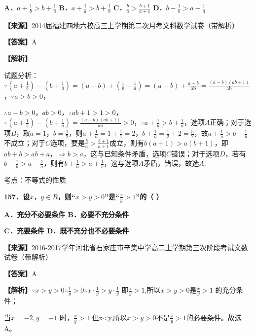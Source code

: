 \documentclass[
]{article}
\begin{document}
\textbf{A．}\(a + \frac{1}{b} > b + \frac{1}{a}\)
\textbf{B．}\(a + \frac{1}{a} > b + \frac{1}{b}\)
\textbf{C．}\(\frac{b}{a} > \frac{b + 1}{a + 1}\)
\textbf{D．}\(b - \frac{1}{b} > a - \frac{1}{a}\)

\textbf{【来源】}2014届福建四地六校高三上学期第二次月考文科数学试卷（带解析）

\textbf{【答案】}A

\textbf{【解析】}

试题分析：\(\because(a + \frac{1}{b}) - (b + \frac{1}{a}) = (a - b) + (\frac{1}{b} - \frac{1}{a}) = (a - b) + \frac{a - b}{\text{ab}} = \frac{(a - b)(ab + 1)}{\text{ab}}\)，\(\because a > b > 0\)，

\(\therefore a - b > 0\)，\(ab > 0\)，\(\therefore ab + 1 > 1 > 0\)，\(\therefore(a + \frac{1}{b}) - (b + \frac{1}{a}) = \frac{(a - b)(ab + 1)}{\text{ab}} > 0\)，\(\therefore a + \frac{1}{b} > b + \frac{1}{a}\)，选项\(A\)正确；对于选项\(B\)，取\(a = 1\)，\(b = \frac{1}{2}\)，则\(a + \frac{1}{a} = 1 + \frac{1}{1} = 2\)，\(b + \frac{1}{b} = \frac{1}{2} + 2 = \frac{5}{2}\)，故\(a + \frac{1}{a} > b + \frac{1}{b}\)不成立；对于\(C\)选项，要是\(\frac{b}{a} > \frac{b + 1}{a + 1}\)成立，则有\(b(a + 1) > a(b + 1)\)，即\(ab + b > ab + a\)，\(\Rightarrow b > a\)，这与已知条件矛盾，选项\(C\)错误；对于选项\(D\)，若有\(b - \frac{1}{b} > a - \frac{1}{a}\)，则有\(b + \frac{1}{a} > a + \frac{1}{b}\)，这与选项\(A\)矛盾，错误，故选\(A\).

考点：不等式的性质

\textbf{157．设}\(x，y \in R\)\textbf{，则``}\(x > y > 0\)\textbf{''是``}\(\frac{x}{y} > 1\)\textbf{''的（
）}

\textbf{A．充分不必要条件 B．必要不充分条件}

\textbf{C．充要条件 D．既不充分也不必要条件}

\textbf{【来源】}2016-2017学年河北省石家庄市辛集中学高二上学期第三次阶段考试文数试卷（带解析）

\textbf{【答案】}A

\textbf{【解析】}\(\because x > y > 0\therefore\frac{1}{y} > 0\therefore x \cdot \frac{1}{y} > y \cdot \frac{1}{y}\)
即\(\frac{\text{x}}{y} > 1\),所以\(x > y > 0\)是\(\frac{x}{y} > 1\)
的充分条件；

当\(x = - 2,y = - 1\) 时，\(\frac{x}{y} > 1\)
但x\textless y,所以\(x > y > 0\)不是\(\frac{x}{y} > 1\)的必要条件。故选A。
\end{document}
